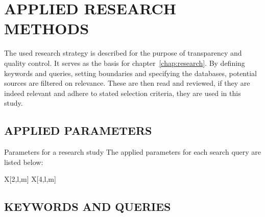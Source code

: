 \chapter{APPLIED RESEARCH METHODS}\label{app:researchmethod}

The used research strategy is described for the purpose of transparency and quality control. It serves as the basis for chapter~\ref{chap:research}. By defining keywords and queries, setting boundaries and specifying the databases, potential sources are filtered on relevance. These are then read and reviewed, if they are indeed relevant and adhere to stated selection criteria, they are used in this study.

\section*{APPLIED PARAMETERS}
Parameters for a research study
The applied parameters for each search query are listed below:

\begin{RoyalTable}{X[2,l,m] X[4,l,m]}
\end{RoyalTable}

\section*{KEYWORDS AND QUERIES}

